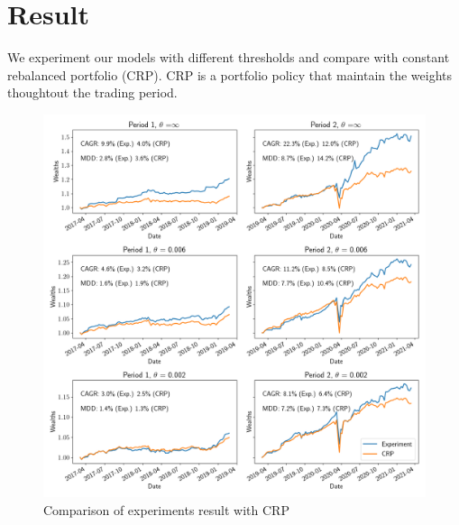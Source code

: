 \section{Result}

We experiment our models with different thresholds and compare with constant rebalanced portfolio (CRP). 
CRP is a portfolio policy that maintain the weights thoughtout the trading period. 
\begin{figure}[ht]
  \includegraphics[width=15cm]{images/crp_compare.png}
  \caption [Comparison of experiments result with CRP]{Comparison of experiments result with CRP}
  \label{fig:crp_compare}
\end{figure}